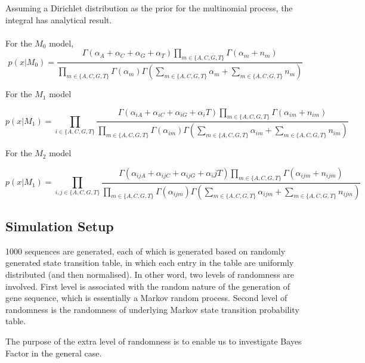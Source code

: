 \documentclass[paper=a4, fontsize=11pt]{scrartcl} %
\numberwithin{equation}{section} %
\numberwithin{figure}{section} %
\numberwithin{table}{section} %
\begin{document}
Assuming a Dirichlet distribution as the prior for the multinomial process, the integral has analytical result. 
\\\\
For the $M_0$ model, 
\begin {equation}
p (x| M_0) = \frac{\Gamma (\alpha_A + \alpha_C + \alpha_G + \alpha_T) \prod\limits_{m \in \{A,C,G,T\}} \Gamma (\alpha_m + n_m)} {\prod\limits_{m \in \{A,C,G,T\}} \Gamma (\alpha_m) \Gamma (\sum\limits_{m \in \{A,C,G,T\}}\alpha_m + \sum\limits_{m \in \{A,C,G,T\}}n_m)}
\end {equation}  

For the $M_1$ model

\begin {equation}
p (x| M_1) = \prod\limits_{i \in \{A,C,G,T\}} \frac{\Gamma (\alpha_{iA} + \alpha_{iC} + \alpha_{iG} + \alpha_iT) \prod\limits_{m \in \{A,C,G,T\}} \Gamma (\alpha_{im} + n_{im})} {\prod\limits_{m \in \{A,C,G,T\}} \Gamma (\alpha_{im}) \Gamma (\sum\limits_{m \in \{A,C,G,T\}}\alpha_{im} + \sum\limits_{m \in \{A,C,G,T\}}n_{im})}
\end {equation}  

For the $M_2$ model

\begin {equation}
p (x| M_1) = \prod\limits_{i,j \in \{A,C,G,T\}} \frac{\Gamma (\alpha_{ijA} + \alpha_{ijC} + \alpha_{ijG} + \alpha_ijT) \prod\limits_{m \in \{A,C,G,T\}} \Gamma (\alpha_{ijm} + n_{ijm})} {\prod\limits_{m \in \{A,C,G,T\}} \Gamma (\alpha_{ijm}) \Gamma (\sum\limits_{m \in \{A,C,G,T\}}\alpha_{ijm} + \sum\limits_{m \in \{A,C,G,T\}}n_{ijm})}
\end {equation}  

\subsection {Simulation Setup}

1000 sequences are generated, each of which is generated based on randomly generated state transition table, in which each entry in the table are uniformly distributed (and then normalised). In other word, two levels of randomness are involved. First level is associated with the random nature of the generation of gene sequence, which is essentially a Markov random process. Second level of randomness is  the randomness of underlying Markov state transition probability table. 


The purpose of the extra level of randomness is to enable us to investigate Bayes Factor in the general case.
\end{document}
